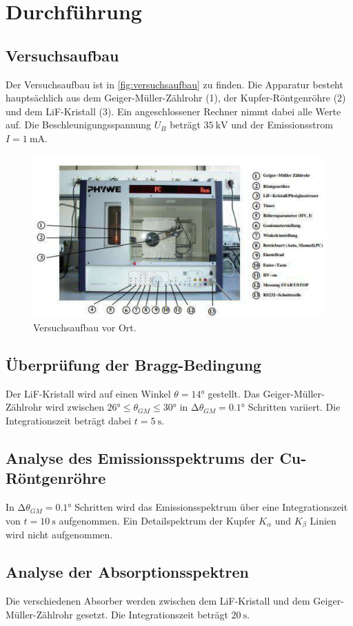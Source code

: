 \section{Durchführung}
\label{sec:Durchführung}

\subsection{Versuchsaufbau}
\label{subsec:Versuchsaufbau}
Der Versuchsaufbau ist in \autoref{fig:versuchsaufbau} zu finden.
Die Apparatur besteht hauptsächlich aus dem Geiger-Müller-Zählrohr (1), der Kupfer-Röntgenröhre (2)
und dem LiF-Kristall (3).
Ein angeschlossener Rechner nimmt dabei alle Werte auf.
Die Beschleunigungsspannung $U_B$ beträgt $\SI{35}{\kilo\volt}$ und der Emissionsstrom $I = \SI{1}{\milli\ampere}$.

\begin{figure}
    \centering
    \includegraphics[width=\textwidth]{content/versuchsaufbau.pdf}
    \caption{Versuchsaufbau vor Ort.\cite{anleitung}}
    \label{fig:versuchsaufbau}
\end{figure}

\subsection{Überprüfung der Bragg-Bedingung}
\label{subsec:braggbedingung}
Der LiF-Kristall wird auf einen Winkel $\theta = 14°$ gestellt.
Das Geiger-Müller-Zählrohr wird zwischen $26° \leq \theta_{GM} \leq 30°$ in $\increment \theta_{GM} = 0.1°$ Schritten variiert.
Die Integrationszeit beträgt dabei $t = \SI{5}{\second}$.

\subsection{Analyse des Emissionsspektrums der Cu-Röntgenröhre}
\label{subsec:emissionspektrum}
In $\increment \theta_{GM} = 0.1°$ Schritten wird das Emissionsspektrum über eine Integrationszeit von $t = \SI{10}{\second}$ aufgenommen.
Ein Detailspektrum der Kupfer $K_\alpha$  und $K_\beta$ Linien wird nicht aufgenommen.

\subsection{Analyse der Absorptionsspektren}
\label{subsec:absorptionsspektren}
Die verschiedenen Absorber werden zwischen dem LiF-Kristall und dem Geiger-Müller-Zählrohr gesetzt.
Die Integrationszeit beträgt $\SI{20}{\second}$.